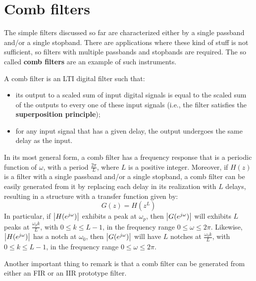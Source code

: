 \documentclass[../../main/main.tex]{subfiles}
\begin{document}

\section{Comb filters}
The simple filters discussed so far are characterized either by a single passband and/or a single stopband. There are applications where these kind of stuff is not sufficient, so filters with multiple passbands and stopbands are required. The so called \textbf{comb filters} are an example of such instruments.

A comb filter is an LTI digital filter such that:
\begin{itemize}
    \item its output to a scaled sum of input digital signals is equal to the scaled sum of the outputs to every one of these input signals (i.e., the filter satisfies the \textbf{superposition principle});
    \item for any input signal that has a given delay, the output undergoes the same delay as the input.
\end{itemize}
In its most general form, a comb filter has a frequency response that is a periodic function of \( \omega \), with a period \( \frac{2\pi}{L} \), where \( L \) is a positive integer.
Moreover, if \( H(z) \) is a filter with a single passband and/or a single stopband, a comb filter can be easily generated from it by replacing each delay in its realization with \( L \) delays, resulting in a structure with a transfer function given by:
\begin{equation}
    G(z)
    =
    H(z^{L})
    \label{eq:L21_S05_1}
\end{equation}
In particular, if \( \abs{H(e^{j\omega})} \) exhibits a peak at \( \omega_{p} \), then \( \abs{G(e^{j\omega})} \) will exhibits \( L \) peaks at \( \frac{\omega_{p}k}{L} \), with \( 0 \le k \le L-1 \), in the frequency range \( 0 \le \omega \le 2\pi \).
Likewise, \( \abs{H(e^{j\omega})} \) has a notch at \( \omega_{0} \), then \( \abs{G(e^{j\omega})} \) will have \( L \) notches at \( \frac{\omega_{0}k}{L} \), with \( 0 \le k \le L-1 \), in the frequency range \( 0 \le \omega \le 2\pi \).

Another important thing to remark is that a comb filter can be generated from either an FIR or an IIR prototype filter.
\end{document}
